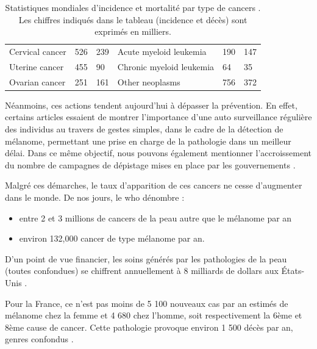 \begin{table}[H]
\begin{tabular}{lll|lll}
    Cervical cancer                     & 526               & 239           &  Acute myeloid leukemia          & 190                & 147           \\
    Uterine cancer                      & 455               & 90            &  Chronic myeloid leukemia        & 64                 & 35            \\
    Ovarian cancer                      & 251               & 161           &  Other neoplasms                 & 756                & 372           \\
    \end{tabular}    
    \caption{Statistiques mondiales d’incidence et mortalité par type de cancers \cite{Karimkhani2017}. Les chiffres indiqués dans le tableau (incidence et décès) sont exprimés en milliers.}
    \label{tab:cancer_incidence}
\end{table}\par

Néanmoins, ces actions tendent aujourd’hui à dépasser la prévention. En effet, certains articles essaient de montrer l’importance d’une auto surveillance régulière des individus au travers de gestes simples, dans le cadre de la détection de mélanome, permettant une prise en charge de la pathologie dans un meilleur délai. Dans ce même objectif, nous pouvons également mentionner l’accroissement  du nombre de campagnes de dépistage mises en place par les gouvernements \cite{Friedman1985}.\par

Malgré ces démarches, le taux d’apparition de ces cancers ne cesse d’augmenter dans le monde. De nos jours, le \gls{who} dénombre :
\begin{itemize}
\item entre 2 et 3 millions de cancers de la peau autre que le mélanome par an
\item environ 132,000 cancer de type mélanome par an.
\end{itemize}\par

D'un point de vue financier, les soins générés par les pathologies de la peau (toutes confondues) se chiffrent annuellement à 8 milliards de dollars aux États-Unis \cite{Farberg2017a}.\par

Pour la France, ce n’est pas moins de 5 100 nouveaux cas par an estimés de mélanome chez la femme et 4 680 chez l’homme, soit respectivement la 6ème et 8ème cause de cancer. Cette pathologie provoque environ 1 500 décès par an, genres confondus \cite{Thuret2012}.\par

